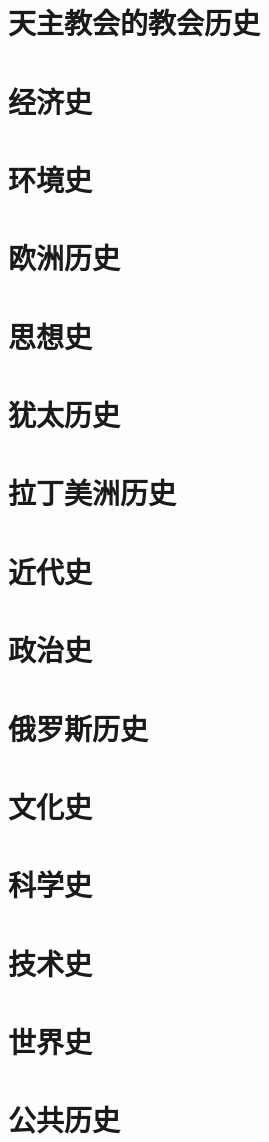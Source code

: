 \documentclass[UTF8]{../RepresentationUniverse}
\begin{document}
\section{天主教会的教会历史}
\section{经济史}
\section{环境史}
\section{欧洲历史}
\section{思想史}
\section{犹太历史}
\section{拉丁美洲历史}
\section{近代史}
\section{政治史}
\section{俄罗斯历史}
\section{文化史}
\section{科学史}
\section{技术史}
\section{世界史}
\section{公共历史}
\end{document}
